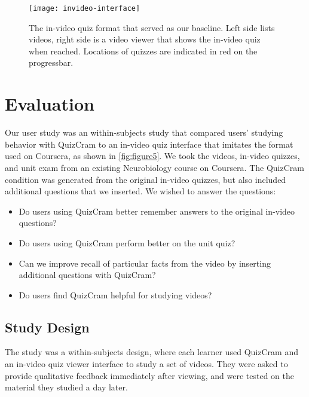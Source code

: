\documentclass{chi-ext}
\begin{document}
\begin{figure}
\centering
\texttt{[image: invideo-interface]}
\caption{The in-video quiz format that served as our baseline. Left side lists videos, right side is a video viewer that shows the in-video quiz when reached. Locations of quizzes are indicated in red on the progressbar.}
\label{fig:figure5}
\end{figure}

\section{Evaluation}
Our user study was an within-subjects study that compared users' studying behavior with QuizCram to an in-video quiz interface that imitates the format used on Coursera, as shown in \autoref{fig:figure5}. We took the videos, in-video quizzes, and unit exam from an existing Neurobiology course on Coursera. The QuizCram condition was generated from the original in-video quizzes, but also included additional questions that we inserted. We wished to answer the questions:

\begin{itemize}
\item Do users using QuizCram better remember answers to the original in-video questions?
\item Do users using QuizCram perform better on the unit quiz?
\item Can we improve recall of particular facts from the video by inserting additional questions with QuizCram?
\item Do users find QuizCram helpful for studying videos?
\end{itemize}

\subsection{Study Design}

The study was a within-subjects design, where each learner used QuizCram and an in-video quiz viewer interface to study a set of videos. They were asked to provide qualitative feedback immediately after viewing, and were tested on the material they studied a day later.
\end{document}
